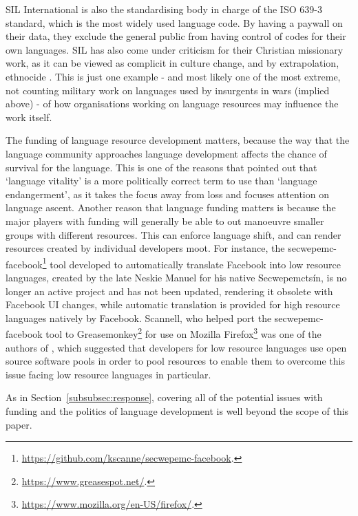 SIL International is also the standardising body in charge of the ISO 639-3 standard, which is the most widely used language code. By having a paywall on their data, they exclude the general public from having control of codes for their own languages. SIL has also come under criticism for their Christian missionary work, as it can be viewed as complicit in culture change, and by extrapolation, ethnocide \citep{dobrin2009sil, dobrin2009practical, everett2009don}. This is just one example - and most likely one of the most extreme, not counting military work on languages used by insurgents in wars (implied above) - of how organisations working on language resources may influence the work itself.

The funding of language resource development matters, because the way that the language community approaches language development affects the chance of survival for the language. This is one of the reasons that \citet{grenoble2016response} pointed out that `language vitality' is a more politically correct term to use than `language endangerment', as it takes the focus away from loss and focuses attention on language ascent. Another reason that language funding matters is because the major players with funding will generally be able to out manoeuvre smaller groups with different resources. This can enforce language shift, and can render resources created by individual developers moot. For instance, the secwepemc-facebook\footnote{\href{https://github.com/kscanne/secwepemc-facebook}{https://github.com/kscanne/secwepemc-facebook}. } tool developed to automatically translate Facebook into low resource languages, created by the late Neskie Manuel for his native Secwepemcts\'in, is no longer an active project and has not been updated, rendering it obsolete with Facebook UI changes, while automatic translation is provided for high resource languages natively by Facebook. Scannell, who helped port the secwepemc-facebook tool to Greasemonkey\footnote{\href{https://www.greasespot.net/}{https://www.greasespot.net/}. } for use on Mozilla Firefox\footnote{\href{https://www.mozilla.org/en-US/firefox/}{https://www.mozilla.org/en-US/firefox/}. } was one of the authors of \citet{streiter2006implementing}, which suggested that developers for low resource languages use open source software pools in order to pool resources to enable them to overcome this issue facing low resource languages in particular.

As in Section~\ref{subsubsec:response}, covering all of the potential issues with funding and the politics of language development is well beyond the scope of this paper.

